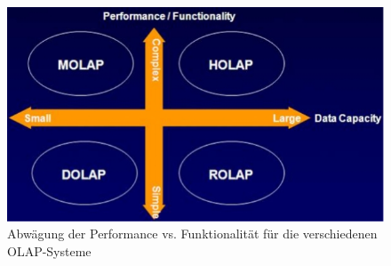 \documentclass[a4paper, 11pt, nofootinbib]{article}
\begin{document}
\begin{figure}[htb]
	\centering
	\includegraphics[keepaspectratio=true,height=12\baselineskip]{performance_vs_functionality.jpg}
	\caption{Abwägung der Performance vs. Funktionalität für die verschiedenen OLAP-Systeme}
	\label{fig:performance_functionality}
\end{figure}
\end{document}
